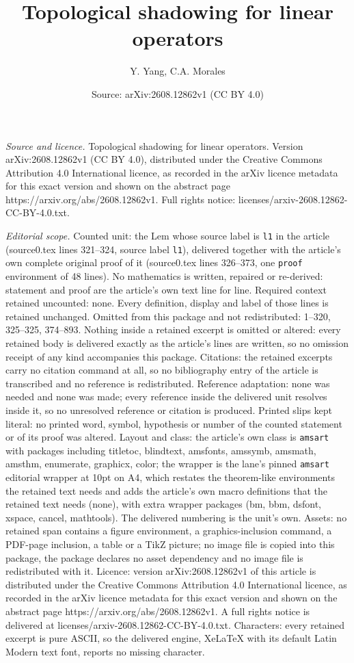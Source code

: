 \documentclass[10pt,a4paper]{amsart}
\title[Topological shadowing for linear operators]{Topological shadowing for linear operators}
\author{Y. Yang, C.A. Morales}
\date{Source: arXiv:2608.12862v1 (CC BY 4.0)}
\begin{document}
\maketitle

\noindent\emph{Source and licence.} Topological shadowing for linear operators. Version arXiv:2608.12862v1 (CC BY 4.0), distributed under the Creative Commons Attribution 4.0 International licence, as recorded in the arXiv licence metadata for this exact version and shown on the abstract page https://arxiv.org/abs/2608.12862v1. Full rights notice: licenses/arxiv-2608.12862-CC-BY-4.0.txt.\par\smallskip

\noindent\textit{Editorial scope.} Counted unit: the Lem whose source label is \texttt{l1} in the article (source0.tex lines 321--324, source label \texttt{l1}), delivered together with the article's own complete original proof of it (source0.tex lines 326--373, one \texttt{proof} environment of 48 lines). No mathematics is written, repaired or re-derived: statement and proof are the article's own text line for line. Required context retained uncounted: none. Every definition, display and label of those lines is retained unchanged. Omitted from this package and not redistributed: 1--320, 325--325, 374--893. Nothing inside a retained excerpt is omitted or altered: every retained body is delivered exactly as the article's lines are written, so no omission receipt of any kind accompanies this package. Citations: the retained excerpts carry no citation command at all, so no bibliography entry of the article is transcribed and no reference is redistributed. Reference adaptation: none was needed and none was made; every reference inside the delivered unit resolves inside it, so no unresolved reference or citation is produced. Printed slips kept literal: no printed word, symbol, hypothesis or number of the counted statement or of its proof was altered. Layout and class: the article's own class is \texttt{amsart} with packages including titletoc, blindtext, amsfonts, amssymb, amsmath, amsthm, enumerate, graphicx, color; the wrapper is the lane's pinned \texttt{amsart} editorial wrapper at 10pt on A4, which restates the theorem-like environments the retained text needs and adds the article's own macro definitions that the retained text needs (none), with extra wrapper packages (bm, bbm, dsfont, xspace, cancel, mathtools). The delivered numbering is the unit's own. Assets: no retained span contains a figure environment, a graphics-inclusion command, a PDF-page inclusion, a table or a TikZ picture; no image file is copied into this package, the package declares no asset dependency and no image file is redistributed with it. Licence: version arXiv:2608.12862v1 of this article is distributed under the Creative Commons Attribution 4.0 International licence, as recorded in the arXiv licence metadata for this exact version and shown on the abstract page https://arxiv.org/abs/2608.12862v1. A full rights notice is delivered at licenses/arxiv-2608.12862-CC-BY-4.0.txt. Characters: every retained excerpt is pure ASCII, so the delivered engine, XeLaTeX with its default Latin Modern text font, reports no missing character.
\end{document}
